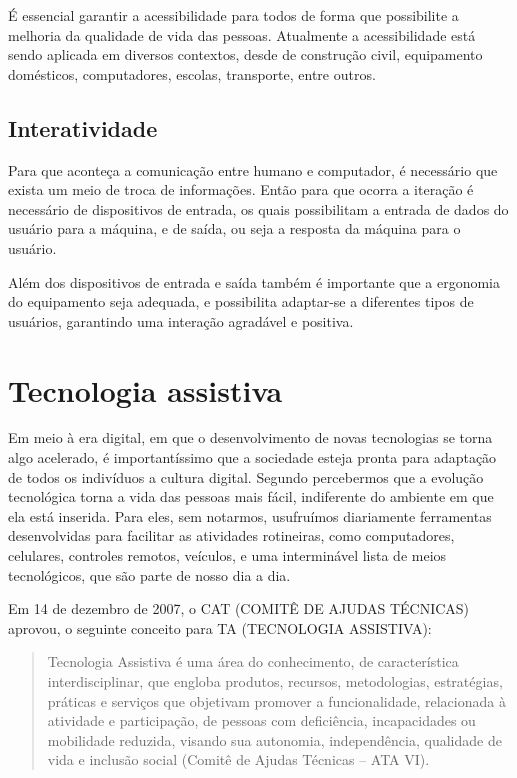 \documentclass[
	12pt,			%
	openright,		%
	oneside,			%
	a4paper,			%
	chapter=TITLE,		%
	english,			%
	brazil,			%
	]{abntex2}
\begin{document}
É essencial garantir a acessibilidade para todos de forma que possibilite a melhoria da qualidade de vida das pessoas. Atualmente a acessibilidade está sendo aplicada em diversos contextos, desde de construção civil, equipamento domésticos, computadores, escolas, transporte, entre outros.

\subsection{Interatividade}

Para que aconteça a comunicação entre humano e computador, é necessário que exista um meio de troca de informações. Então para que ocorra a iteração é necessário de dispositivos de entrada, os quais possibilitam a entrada de dados do usuário para a máquina, e de saída, ou seja a resposta da máquina para o usuário.

Além dos dispositivos de entrada e saída também é importante que a ergonomia do equipamento seja adequada, e possibilita adaptar-se a diferentes tipos de usuários, garantindo uma interação agradável e positiva.

\section{Tecnologia assistiva}

Em meio à era digital, em que o desenvolvimento de novas tecnologias se torna algo acelerado, é importantíssimo que a sociedade esteja pronta para adaptação de todos os indivíduos a cultura digital. Segundo \cite{castrota} percebermos que a evolução tecnológica torna a vida das pessoas mais fácil, indiferente do ambiente em que ela está inserida. Para eles, sem notarmos, usufruímos diariamente ferramentas desenvolvidas para facilitar as atividades rotineiras, como computadores, celulares, controles remotos, veículos, e uma interminável lista de meios tecnológicos, que são parte de nosso dia a dia.

Em 14 de dezembro de 2007, o CAT (COMITÊ DE AJUDAS TÉCNICAS) aprovou, o seguinte conceito para TA (TECNOLOGIA ASSISTIVA):

\begin{quote}\small\setlength{\leftskip}{4cm}
Tecnologia Assistiva é uma área do conhecimento, de característica interdisciplinar, que engloba produtos, recursos, metodologias, estratégias, práticas e serviços que objetivam promover a funcionalidade, relacionada à atividade e participação, de pessoas com deficiência, incapacidades ou mobilidade reduzida, visando sua autonomia, independência, qualidade de vida e inclusão social (Comitê de Ajudas Técnicas – ATA VI). 
\end{quote}
\end{document}

